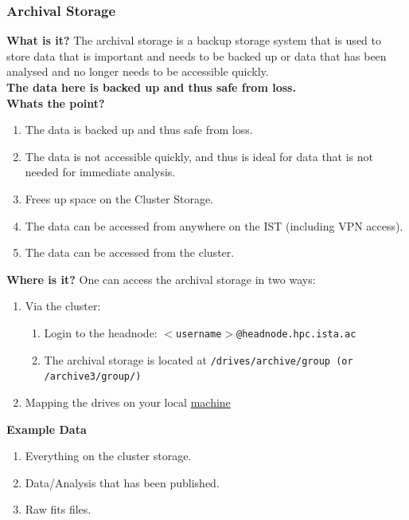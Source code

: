 \documentclass{article}
\begin{document}
\subsubsection{Archival Storage}
\textbf{What is it?}
\newline
The archival storage is a backup storage system that is used to store data that is important and needs to be backed up or data that has been analysed and no longer needs to be accessible quickly.
\\
\textbf{The data here is backed up and thus safe from loss.}
\\

\noindent
\textbf{Whats the point?}
\newline
\begin{enumerate}
    \item The data is backed up and thus safe from loss.
    \item The data is not accessible quickly, and thus is ideal for data that is not needed for immediate analysis.
    \item Frees up space on the Cluster Storage.
    \item The data can be accessed from anywhere on the IST  (including VPN access).
    \item The data can be accessed from the cluster.
\end{enumerate}

\noindent
\textbf{Where is it?}
\newline
One can access the archival storage in two ways:
\begin{enumerate}
    \item Via the cluster: 
    \begin{enumerate}
        \item Login to the headnode: \texttt{$<$username$>$@headnode.hpc.ista.ac}
        \item The archival storage is located at \texttt{/drives/archive/group (or /archive3/group/)}
    \end{enumerate}
    \item Mapping the drives on your local \href{https://it.pages.ist.ac.at/docs/it-documentation/fileservers/fileshare/}{machine}
\end{enumerate}

\noindent
\textbf{Example Data}
\begin{enumerate}
    \item Everything on the cluster storage.
    \item Data/Analysis that has been published.
    \item Raw fits files.
\end{enumerate}
\end{document}
